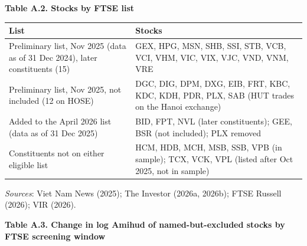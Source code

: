 \documentclass[review,authoryear,12pt]{elsarticle}
\begin{document}
\textbf{Table A.2. Stocks by FTSE list}

\begin{longtable}[]{@{}>{\raggedright\arraybackslash}p{}>{\raggedright\arraybackslash}p{}@{}}
\toprule\noalign{}
\begin{minipage}[b]{\linewidth}\raggedright
List
\end{minipage} & \begin{minipage}[b]{\linewidth}\raggedright
Stocks
\end{minipage} \\
\midrule\noalign{}
\endhead
\bottomrule\noalign{}
\endlastfoot
Preliminary list, Nov 2025 (data as of 31 Dec 2024), later constituents
(15) & GEX, HPG, MSN, SHB, SSI, STB, VCB, VCI, VHM, VIC, VIX, VJC, VND,
VNM, VRE \\
Preliminary list, Nov 2025, not included (12 on HOSE) & DGC, DIG, DPM,
DXG, EIB, FRT, KBC, KDC, KDH, PDR, PLX, SAB (HUT trades on the Hanoi
exchange) \\
Added to the April 2026 list (data as of 31 Dec 2025) & BID, FPT, NVL
(later constituents); GEE, BSR (not included); PLX removed \\
Constituents not on either eligible list & HCM, HDB, MCH, MSB, SSB, VPB
(in sample); TCX, VCK, VPL (listed after Oct 2025, not in sample) \\
\end{longtable}

\emph{Sources}: Viet Nam News (2025); The Investor (2026a, 2026b); FTSE
Russell (2026); VIR (2026).

\textbf{Table A.3. Change in log Amihud of named-but-excluded stocks by
FTSE screening window}
\end{document}
